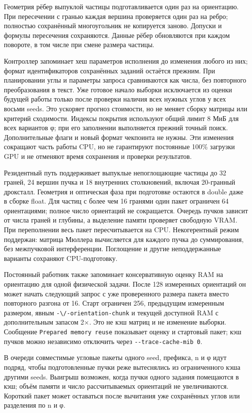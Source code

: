 Геометрия рёбер выпуклой частицы подготавливается один раз на
ориентацию. При пересечении с гранью каждая вершина проверяется один раз
на ребро; полностью сохранённый многоугольник не копируется заново.
Допуски и формулы пересечения сохраняются. Данные рёбер обновляются при
каждом повороте, в том числе при смене размера частицы.

Контроллер запоминает хеш параметров исполнения до изменения любого из
них; формат идентификаторов сохранённых заданий остаётся прежним. При
планировании углы и параметры запроса сравниваются как числа, без
повторного преобразования в текст. Уже готовое начало выборки
исключается из оценки будущей работы только после проверки наличия всех
нужных углов у всех восьми seeds. Это ускоряет прогноз стоимости, но не
меняет сборку матрицы или критерий сходимости. Индексы покрытия
используют общий лимит 8 МиБ для всех вариантов φ; при его заполнении
выполняется прежний точный поиск. Дополнительные флаги и новый формат
чекпоинта не нужны. Эти изменения сокращают часть работы CPU, но не
гарантируют постоянные 100\% загрузки GPU и не отменяют время сохранения
и проверки результатов.

Резидентный путь поддерживает выпуклые непоглощающие частицы до 32
граней, 24 вершин пучка и 18 внутренних столкновений, включая 20-гранный
дроксталл. Геометрия и оптическая фаза при подготовке остаются в double
даже в сборке float. Для частиц с более чем 16 гранями один пакет
ограничен 64 ориентациями; полное число ориентаций не сокращается.
Очередь пучков зависит от числа граней и глубины, а выделение памяти
проверяет свободную VRAM. При переполнении весь пакет пересчитывается на
CPU. Некогерентный режим поддержан: матрица Мюллера вычисляется для
каждого пучка до суммирования, без межпучковой интерференции. Поглощение
и другие неподдержанные варианты сохраняют CPU-подготовку.

Постоянный работник также запоминает консервативную оценку RAM на
ориентацию для одной физической задачи. После 128 измеренных ориентаций
он может начать следующий запрос с уже проверенного размера пакета
вместо повторного разгона от 16. Старт ограничен 256, предыдущим
измеренным размером, явным \nolinkurl{-\/-orientation-chunk} и текущей
доступной RAM с дополнительным запасом 2×. Это не кэш матриц и не
изменение выборки. Сообщение \texttt{Prepared\ memory\ reuse} показывает
оценку и стартовый пакет; кэш пучков можно независимо отключить через
\texttt{-\/-trace-cache-mib\ 0}.

В очереди совместимые угловые пакеты одного seed, префикса, n и φ идут
подряд, чтобы подготовленные пучки реже вытеснялись из ограниченного
кэша другими seeds. Выигрыш возможен, когда пучки одного задания
помещаются в кэш; объём памяти и число рассчитываемых ориентаций не
увеличиваются. Короткий пакет может оставаться после вычитания уже
сохранённых углов или разделения по n и φ.

